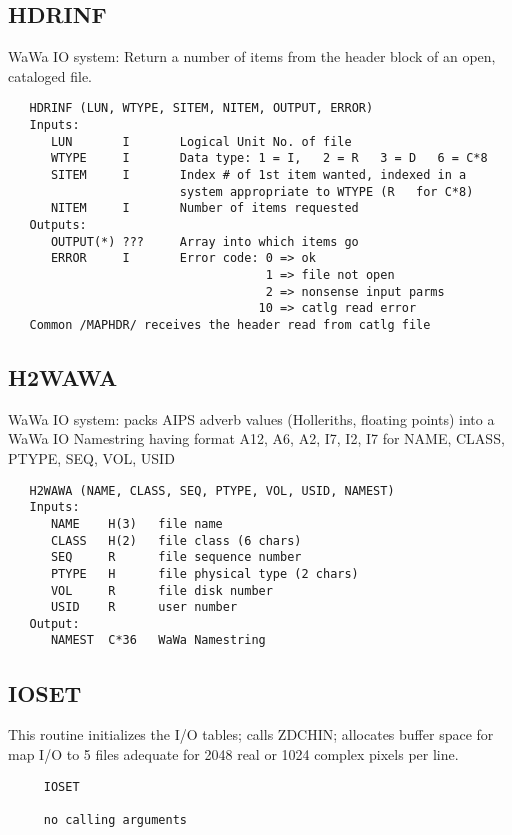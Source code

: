 \subsection{HDRINF}
WaWa IO system:   Return a number of items from the header block
of an open, cataloged file.
\begin{verbatim}
   HDRINF (LUN, WTYPE, SITEM, NITEM, OUTPUT, ERROR)
   Inputs:
      LUN       I       Logical Unit No. of file
      WTYPE     I       Data type: 1 = I,   2 = R   3 = D   6 = C*8
      SITEM     I       Index # of 1st item wanted, indexed in a
                        system appropriate to WTYPE (R   for C*8)
      NITEM     I       Number of items requested
   Outputs:
      OUTPUT(*) ???     Array into which items go
      ERROR     I       Error code: 0 => ok
                                    1 => file not open
                                    2 => nonsense input parms
                                   10 => catlg read error
   Common /MAPHDR/ receives the header read from catlg file

\end{verbatim}

\subsection{H2WAWA}
WaWa IO system: packs AIPS adverb values (Holleriths, floating points)
into a WaWa IO Namestring having format A12, A6, A2, I7, I2, I7 for
NAME, CLASS, PTYPE, SEQ, VOL, USID
\begin{verbatim}
   H2WAWA (NAME, CLASS, SEQ, PTYPE, VOL, USID, NAMEST)
   Inputs:
      NAME    H(3)   file name
      CLASS   H(2)   file class (6 chars)
      SEQ     R      file sequence number
      PTYPE   H      file physical type (2 chars)
      VOL     R      file disk number
      USID    R      user number
   Output:
      NAMEST  C*36   WaWa Namestring
\end{verbatim}

\subsection{IOSET}
This routine initializes the I/O tables;  calls ZDCHIN;  allocates
buffer space for map I/O to 5 files adequate for 2048 real or 1024
complex pixels per line.

\begin{verbatim}
     IOSET

     no calling arguments


\end{verbatim}

